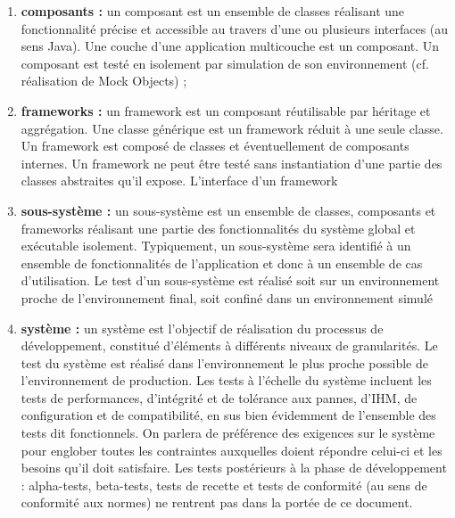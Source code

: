 \begin{enumerate}
\texttt{Arc}
  . Dans le cas de hi\'erarchies de classes (hors les
     cas des frameworks), les classes de bases et sous-classes sont
     consid\'er\'ees soient globalement lorsqu'elles sont toutes connues,
     soit de haut en bas lorsqu'elles sont d\'evelopp\'ees
     ind\'ependamment. Les tests pour une sous-classes inclus
     normalement les tests pour la super-classe.  ; 
\item 
\textbf{composants :}
   un composant est un ensemble de classes
     r\'ealisant une fonctionnalit\'e pr\'ecise et accessible au travers
     d'une ou plusieurs interfaces (au sens Java). Une couche d'une application
     multicouche est un composant. Un composant est test\'e en isolement
     par simulation de son environnement (cf. r\'ealisation de Mock
     Objects) ;  
\item 
\textbf{frameworks : }
   un framework est un composant
     r\'eutilisable par h\'eritage et aggr\'egation. Une classe g\'en\'erique
     est un framework r\'eduit \`a une seule classe. Un framework est
     compos\'e de classes et \'eventuellement de composants internes. Un framework
     ne peut \^etre test\'e sans instantiation d'une partie des classes
     abstraites qu'il expose. L'interface d'un framework  
\item 
\textbf{sous-syst\`eme :}
   un sous-syst\`eme est un ensemble de
     classes, composants et frameworks r\'ealisant une partie des
     fonctionnalit\'es du syst\`eme global et ex\'ecutable
     isolement. Typiquement, un sous-syst\`eme sera identifi\'e \`a un
     ensemble de fonctionnalit\'es de l'application et donc \`a un
     ensemble de cas d'utilisation. Le test d'un sous-syst\`eme est
     r\'ealis\'e soit  sur un environnement proche de l'environnement
     final, soit confin\'e dans un environnement simul\'e  
\item 
\textbf{syst\`eme : }
   un syst\`eme est l'objectif de r\'ealisation
     du processus de d\'eveloppement, constitu\'e d'\'el\'ements \`a diff\'erents
     niveaux de granularit\'es. Le test du syst\`eme est r\'ealis\'e dans
     l'environnement le plus proche possible de l'environnement de
     production. Les tests \`a l'\'echelle du syst\`eme incluent les tests
     de performances, d'int\'egrit\'e et de tol\'erance aux pannes, d'IHM,
     de configuration et de compatibilit\'e, en sus bien \'evidemment de
     l'ensemble des tests dit fonctionnels. On parlera de pr\'ef\'erence
     des exigences sur le syst\`eme pour englober toutes les contraintes
     auxquelles doient r\'epondre celui-ci et les besoins qu'il doit
     satisfaire. Les tests post\'erieurs \`a la phase de d\'eveloppement :
     alpha-tests, beta-tests, tests de recette et tests de conformit\'e
     (au sens de conformit\'e aux normes) ne rentrent pas dans la port\'ee
     de ce document.
\end{enumerate}
  
